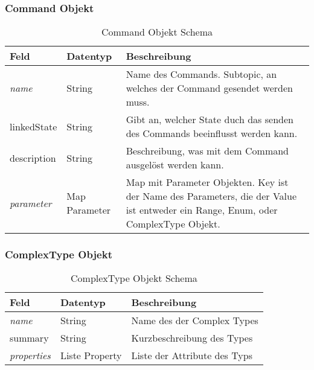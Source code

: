 \subsubsection{Command Objekt}
\begin{table}[H]
\begin{tabularx}{\textwidth}{|l|l|X|}

 \hline \rowcolor{lightgray}
 {\bf Feld } & {\bf Datentyp } & {\bf Beschreibung } \\  \hline
 
 \textit{name}  &   String   &  Name des Commands. Subtopic, an welches der Command gesendet werden muss. \\ \hline
 linkedState  &   String   &  Gibt an, welcher State duch das senden des Commands beeinflusst werden kann. \\ \hline
 description  &   String   &  Beschreibung, was mit dem Command ausgelöst werden kann.  \\ \hline
 \textit{parameter}       &   Map Parameter & Map mit Parameter Objekten. Key ist der Name des Parameters, die der Value ist entweder ein Range, Enum, oder ComplexType Objekt.\\ \hline
\end{tabularx}
\caption{Command Objekt Schema}
\end{table}


\subsubsection{ComplexType Objekt}
\begin{table}[H]
\begin{tabularx}{\textwidth}{|l|l|X|}

 \hline \rowcolor{lightgray}
 {\bf Feld } & {\bf Datentyp } & {\bf Beschreibung } \\  \hline
 
 \textit{name}  &      String   &  Name des der Complex Types \\ \hline
 summary  &   String   &  Kurzbeschreibung des Types \\ \hline
 \textit{properties}  &   Liste Property   &  Liste der Attribute des Typs \\ \hline

\end{tabularx}
\caption{ComplexType Objekt Schema}
\end{table}

